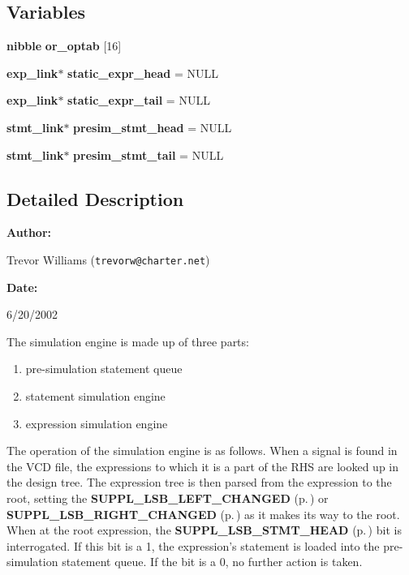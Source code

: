 \subsection*{Variables}
\begin{CompactItemize}
\item 
{\bf nibble} {\bf or\_\-optab} [16]
\item 
{\bf exp\_\-link}$\ast$ {\bf static\_\-expr\_\-head} = NULL
\item 
{\bf exp\_\-link}$\ast$ {\bf static\_\-expr\_\-tail} = NULL
\item 
{\bf stmt\_\-link}$\ast$ {\bf presim\_\-stmt\_\-head} = NULL
\item 
{\bf stmt\_\-link}$\ast$ {\bf presim\_\-stmt\_\-tail} = NULL
\end{CompactItemize}


\subsection{Detailed Description}


\begin{Desc}
\item[{\bf Author: }]\par
Trevor Williams ({\tt trevorw@charter.net}) \end{Desc}
\begin{Desc}
\item[{\bf Date: }]\par
6/20/2002

 The simulation engine is made up of three parts:\begin{enumerate}
\item 
pre-simulation statement queue\item 
statement simulation engine\item 
expression simulation engine\end{enumerate}
\end{Desc}


 The operation of the simulation engine is as follows. When a signal is found in the VCD file, the expressions to which it is a part of the RHS are looked up in the design tree. The expression tree is then parsed from the expression to the root, setting the {\bf SUPPL\_\-LSB\_\-LEFT\_\-CHANGED} {\rm (p.\,\pageref{group__expr__suppl_a9})} or {\bf SUPPL\_\-LSB\_\-RIGHT\_\-CHANGED} {\rm (p.\,\pageref{group__expr__suppl_a10})} as it  makes its way to the root. When at the root expression, the {\bf SUPPL\_\-LSB\_\-STMT\_\-HEAD} {\rm (p.\,\pageref{group__expr__suppl_a4})}  bit is interrogated. If this bit is a 1, the expression's statement is loaded  into the pre-simulation statement queue. If the bit is a 0, no further action is  taken.

